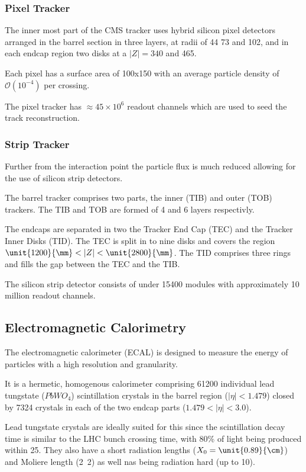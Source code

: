 \subsubsection{Pixel Tracker}
The inner most part of the CMS tracker uses hybrid silicon pixel detectors arranged in
the barrel section in three layers, at radii of  44 73 and \unit{102}{\mm}, and in
each endcap region two disks at a $|Z|=340$ and \unit{465}{\mm}.

Each pixel has a surface area of \unit{100x150}{\micron} with an
average particle density of $\mathcal{O}(10^{-4})$ per crossing.

The pixel tracker has $\approx 45\times 10^{6}$ readout channels which are used
to seed the track reconstruction.

\subsubsection{Strip Tracker}
Further from the interaction point the particle flux is much reduced allowing
for the use of silicon strip detectors. 

The barrel tracker comprises two parts, the inner (TIB) and outer (TOB)
trackers. The TIB and TOB are formed of 4 and 6 layers respectivly.

The endcaps are separated in two the Tracker End Cap (TEC) and the Tracker Inner
Disks (TID). The TEC is split in to nine disks and covers the region
$\unit{1200}{\mm} < |Z| < \unit{2800}{\mm}$. The TID comprises three rings
and fills the gap between the TEC and the TIB.

The silicon strip detector consists of under 15400 modules with approximately 10
million readout channels.

\subsection{Electromagnetic Calorimetry}
The electromagnetic calorimeter (ECAL) is 
designed to measure the energy of
particles with a high resolution and granularity.

It is a hermetic, homogenous calorimeter comprising 61200 individual lead
tungstate ($PbWO_{4}$) scintillation crystals in the barrel region
($|\eta|<1.479$) closed by 7324 crystals in each of the two endcap parts
($1.479<|\eta|<3.0$).

Lead tungstate crystals are ideally suited for this since the scintillation
decay time is similar to the LHC bunch crossing time, 
with \unit{80}{\%} of light being produced within \unit{25}{\ns}.
They also have a short radiation lengths ($X_0=\unit{0.89}{\cm}$) 
and Moliere length (\unit{2.2}{\cm}) as well nas being radiation hard
(up to \unit{10}{\mrad}).

